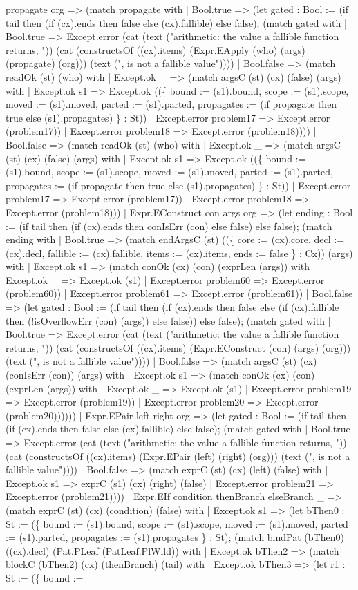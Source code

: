 \documentclass[11pt]{article}
\begin{document}
propagate org => (match propagate with | Bool.true => (let gated : Bool := (if tail then (if (cx).ends then false else (cx).fallible) else false); (match gated with | Bool.true => Except.error (cat (text ("arithmetic: the value a fallible function returns, ")) (cat (constructsOf ((cx).items) (Expr.EApply (who) (args) (propagate) (org))) (text (", is not a fallible value")))) | Bool.false => (match readOk (st) (who) with | Except.ok \_ => (match argsC (st) (cx) (false) (args) with | Except.ok s1 => Except.ok ((\{ bound := (s1).bound, scope := (s1).scope, moved := (s1).moved, parted := (s1).parted, propagates := (if propagate then true else (s1).propagates) \} : St)) | Except.error problem17 => Except.error (problem17)) | Except.error problem18 => Except.error (problem18)))) | Bool.false => (match readOk (st) (who) with | Except.ok \_ => (match argsC (st) (cx) (false) (args) with | Except.ok s1 => Except.ok ((\{ bound := (s1).bound, scope := (s1).scope, moved := (s1).moved, parted := (s1).parted, propagates := (if propagate then true else (s1).propagates) \} : St)) | Except.error problem17 => Except.error (problem17)) | Except.error problem18 => Except.error (problem18))) | Expr.EConstruct con args org => (let ending : Bool := (if tail then (if (cx).ends then conIsErr (con) else false) else false); (match ending with | Bool.true => (match endArgsC (st) ((\{ core := (cx).core, decl := (cx).decl, fallible := (cx).fallible, items := (cx).items, ends := false \} : Cx)) (args) with | Except.ok s1 => (match conOk (cx) (con) (exprLen (args)) with | Except.ok \_ => Except.ok (s1) | Except.error problem60 => Except.error (problem60)) | Except.error problem61 => Except.error (problem61)) | Bool.false => (let gated : Bool := (if tail then (if (cx).ends then false else (if (cx).fallible then (!isOverflowErr (con) (args)) else false)) else false); (match gated with | Bool.true => Except.error (cat (text ("arithmetic: the value a fallible function returns, ")) (cat (constructsOf ((cx).items) (Expr.EConstruct (con) (args) (org))) (text (", is not a fallible value")))) | Bool.false => (match argsC (st) (cx) (conIsErr (con)) (args) with | Except.ok s1 => (match conOk (cx) (con) (exprLen (args)) with | Except.ok \_ => Except.ok (s1) | Except.error problem19 => Except.error (problem19)) | Except.error problem20 => Except.error (problem20)))))) | Expr.EPair left right org => (let gated : Bool := (if tail then (if (cx).ends then false else (cx).fallible) else false); (match gated with | Bool.true => Except.error (cat (text ("arithmetic: the value a fallible function returns, ")) (cat (constructsOf ((cx).items) (Expr.EPair (left) (right) (org))) (text (", is not a fallible value")))) | Bool.false => (match exprC (st) (cx) (left) (false) with | Except.ok s1 => exprC (s1) (cx) (right) (false) | Except.error problem21 => Except.error (problem21)))) | Expr.EIf condition thenBranch elseBranch \_ => (match exprC (st) (cx) (condition) (false) with | Except.ok s1 => (let bThen0 : St := (\{ bound := (s1).bound, scope := (s1).scope, moved := (s1).moved, parted := (s1).parted, propagates := (s1).propagates \} : St); (match bindPat (bThen0) ((cx).decl) (Pat.PLeaf (PatLeaf.PlWild)) with | Except.ok bThen2 => (match blockC (bThen2) (cx) (thenBranch) (tail) with | Except.ok bThen3 => (let r1 : St := (\{ bound := 
\end{document}
